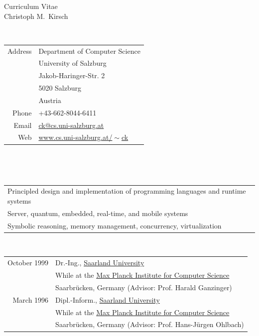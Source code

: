\thispagestyle{empty}

\begin{center}
  {\sc \Huge Curriculum Vitae}\\ \vspace{10mm}
  {\sc \Large Christoph M.~Kirsch}\\ \vspace{12mm}
\end{center} \vfill

 \\
\begin{tabular}{rl}
Address & Department of Computer Science\\
        & University of Salzburg\\
        & Jakob-Haringer-Str. 2\\
        & 5020 Salzburg\\
        & Austria\\
\noalign{\smallskip}
Phone   & +43-662-8044-6411\\
Email   & \href{mailto:ck@cs.uni-salzburg.at}{ck@cs.uni-salzburg.at} \\
Web     & \href{https://www.cs.uni-salzburg.at/~ck}{www.cs.uni-salzburg.at/$\!\sim$ck} \\
\end{tabular} \\ \vfill

 \\
\begin{tabular}{l}
Principled design and implementation of programming languages and runtime systems \\
\noalign{\smallskip}
Server, quantum, embedded, real-time, and mobile systems \\
\noalign{\smallskip}
Symbolic reasoning, memory management, concurrency, virtualization
\end{tabular} \vfill

 \\
\begin{tabular}{rl}
October 1999 & Dr.-Ing., \href{http://www.uni-saarland.de}{Saarland University} \\
             & While at the \href{http://www.mpi-sb.mpg.de}{Max Planck Institute for Computer Science} \\
             & Saarbr{\"u}cken, Germany (Advisor: Prof. Harald Ganzinger)\\
\noalign{\smallskip}
March 1996 & Dipl.-Inform., \href{http://www.uni-saarland.de}{Saarland University} \\
           & While at the \href{http://www.mpi-sb.mpg.de}{Max Planck Institute for Computer Science} \\
           & Saarbr{\"u}cken, Germany (Advisor: Prof. Hans-J{\"u}rgen Ohlbach)\\
\end{tabular} \\ \vfill

